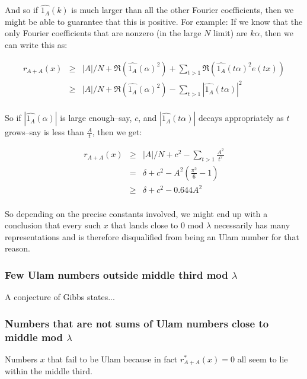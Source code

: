 \documentclass{article}
\theoremstyle{definition}
\theoremstyle{remark}
\numberwithin{equation}{section}
\begin{document}
And so if $\widehat{1_A}(k)$ is much larger than all the other Fourier
coefficients, then we might be able to guarantee that this is
positive.  For example: If we know that the only Fourier coefficients
that are nonzero (in the large $N$ limit) are $k\alpha$, then we can
write this as: 

\begin{eqnarray*}
r_{A+A}(x) &\geq& |A|/N + \Re(\widehat{1_A}(\alpha)^2) + \sum_{t > 1}
 \Re(\widehat{1_A}(t \alpha)^2 e(tx))\\
 &\geq& |A|/N + \Re(\widehat{1_A}(\alpha)^2) - \sum_{t > 1}
 |\widehat{1_A}(t \alpha)|^2\\
\end{eqnarray*}

So if $|\widehat{1_A}(\alpha)|$ is large enough--say, $c$, and
$|\widehat{1_A}(t \alpha)|$ decays appropriately as $t$ grows--say is
less than $\frac{A}{t}$, then we get:



\begin{eqnarray*}
r_{A+A}(x) &\geq& |A|/N + c^2 - \sum_{t > 1}\frac{A^2}{t^2}\\
&=& \delta + c^2 - A^2\left(\frac{\pi^2}{6}-1\right)\\
&\geq& \delta + c^2 - 0.644 A^2\\
\end{eqnarray*}

So depending on the precise constants involved, we might end up with a
conclusion that every such $x$ that lands close to 0 mod $\lambda$
necessarily has many representations and is therefore disqualified
from being an Ulam number for that reason.  

\subsubsection{Few Ulam numbers outside middle third mod $\lambda$}

A conjecture of Gibbs states...

\subsubsection{Numbers that are not sums of Ulam numbers close to middle mod $\lambda$}

Numbers $x$ that fail to be Ulam because in fact $r^*_{A+A}(x) = 0$
all seem to lie within the middle third.  
\end{document}
